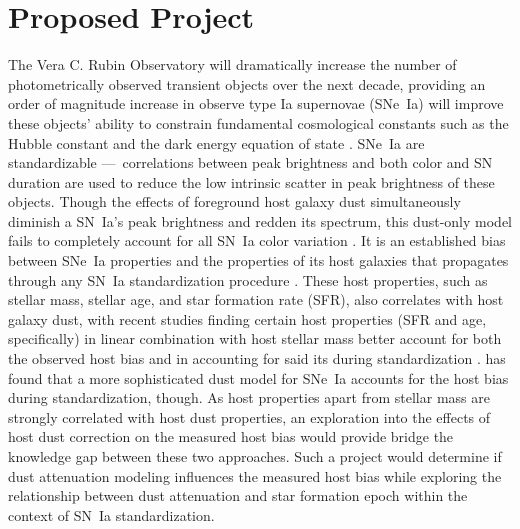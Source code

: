 \documentclass[modern]{aastex63}
\begin{document}
\section{Proposed Project}
The Vera C. Rubin Observatory will dramatically increase the number of photometrically observed transient objects over the next decade, providing an order of magnitude increase in observe type Ia supernovae (SNe~Ia) will improve these objects' ability to constrain fundamental cosmological constants such as the Hubble constant and the dark energy equation of state \citep{Perlmutter1999}.  SNe~Ia are standardizable ---~correlations between peak brightness and both color and SN duration are used to reduce the low intrinsic scatter in peak brightness of these objects.  
Though the effects of foreground host galaxy dust simultaneously diminish a SN~Ia's peak brightness and redden its spectrum, this dust-only model fails to completely account for all SN~Ia color variation \citep{Brout2021}.  
It is an established bias between SNe~Ia properties and the properties of its host galaxies that propagates through any SN~Ia standardization procedure \citep{Rigault2018,Sullivan2010}. 
These host properties, such as stellar mass, stellar age, and star formation rate (SFR), also correlates with host galaxy dust, with recent studies finding certain host properties (SFR and age, specifically) in linear combination with host stellar mass better account for both the observed host bias and in accounting for said its during standardization \citep{Rigault2018,Rose2021}. 
\cite{Brout2021} has found that a more sophisticated dust model for SNe~Ia accounts for the host bias during standardization, though.
As host properties apart from stellar mass are strongly correlated with host dust properties, an exploration into the effects of host dust correction on the measured host bias would provide bridge the knowledge gap between these two approaches. Such a project would determine if dust attenuation modeling influences the measured host bias while exploring the relationship between dust attenuation and star formation epoch within the context of SN~Ia standardization.
\end{document}

